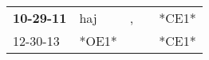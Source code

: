 \begin{supertabular}{p{0.07\textwidth}p{0.06\textwidth}p{0.02\textwidth}p{0.02\textwidth}p{0.06\textwidth}}
 \textbf{10-29-11\textsuperscript{}} &  haj\textsuperscript{} &  , &   &  *CE1* \\
          12-30-13\textsuperscript{} &                  *OE1* &    &   &  *CE1* \\
\end{supertabular}
